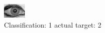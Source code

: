\begin{figure}[h!]
\begin{center}
\includegraphics[width=0.60\columnwidth]{figures/ID2024_class_1_target_2.png}
\end{center}
\caption{ Classification: 1 actual target: 2}
\label{fig:ID2024_class_1_target_2}
\end{figure}
